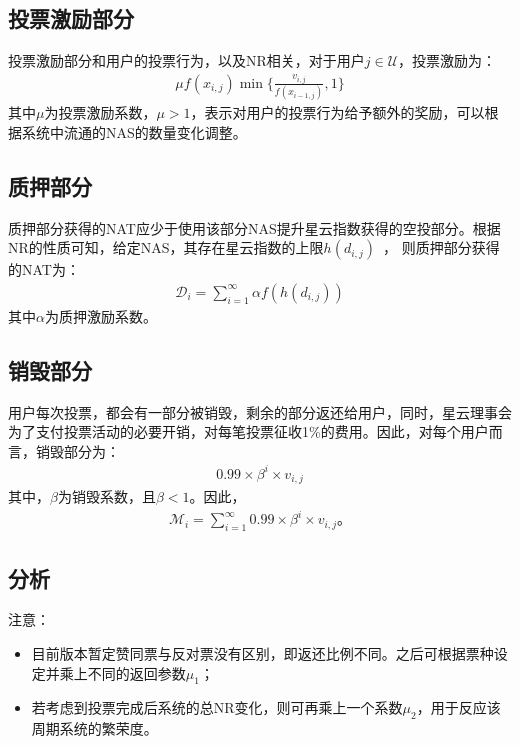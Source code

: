 \subsection{投票激励部分}
投票激励部分和用户的投票行为，以及NR相关，对于用户$j \in \mathcal{U}$，投票激励为：
\begin{align}
\mu f(x_{i,j}) \min\{\frac{v_{i,j}}{f(x_{i-1,j})},1\}
\end{align}
\noindent 其中$\mu$为投票激励系数，$\mu > 1$，表示对用户的投票行为给予额外的奖励，可以根据系统中流通的NAS的数量变化调整。

\subsection{质押部分}
质押部分获得的NAT应少于使用该部分NAS提升星云指数获得的空投部分。根据NR的性质可知，给定NAS，其存在星云指数的上限$h(d_{i,j})$~\cite{ImproveNR}，
则质押部分获得的NAT为：
\begin{align}
\mathcal{D}_i = \sum_{i=1}^{\infty}\alpha f(h(d_{i,j}))
\end{align}
\noindent 其中$\alpha$为质押激励系数。


\subsection{销毁部分}
\label{burn}
用户每次投票，都会有一部分被销毁，剩余的部分返还给用户，同时，星云理事会为了支付投票活动的必要开销，对每笔投票征收1\%的费用。因此，对每个用户而言，销毁部分为：
\begin{align}
0.99 \times \beta^i \times v_{i,j}
\end{align}
\noindent 其中，$\beta$为销毁系数，且$\beta < 1$。因此，
\begin{align}
    \mathcal{M}_i = \sum_{i=1}^{\infty} 0.99 \times \beta^i \times v_{i,j} 。
\end{align}

\subsection{分析}

注意：
\begin{itemize}
\item 目前版本暂定赞同票与反对票没有区别，即返还比例不同。之后可根据票种设定并乘上不同的返回参数$\mu_1$；
\item 若考虑到投票完成后系统的总NR变化，则可再乘上一个系数$\mu_2$，用于反应该周期系统的繁荣度。
\end{itemize}


